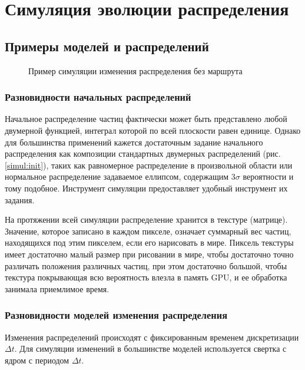 
\chapter{Симуляция эволюции распределения}
\section{Примеры моделей и распределений}
\begin{figure}[ht]
  \begin{center}
  \end{center}
  \caption{Пример симуляции изменения распределения без маршрута}
\end{figure}

\FloatBarrier
\subsection{Разновидности начальных распределений}
Начальное распределение частиц фактически может быть представлено любой двумерной функцией,
интеграл которой по всей плоскости равен единице. Однако для большинства применений кажется
достаточным задание начального распределения как композиции стандартных двумерных распределений
(рис. \ref{simul:init}), таких как равномерное распределение в произвольной области или
 нормальное распределение задаваемое еллипсом, содержащим $3\sigma$ вероятности и тому подобное.
 Инструмент симуляции предоставляет удобный инструмент их задания.

На протяжении всей симуляции распределение хранится в текстуре (матрице). Значение, которое
записано в каждом пикселе, означает суммарный вес частиц, находящихся под этим пикселем,
если его нарисовать в мире. Пиксель текстуры имеет достаточно малый размер при рисовании в мире,
чтобы достаточно точно различать положения различных частиц, при этом достаточно большой,
чтобы текстура покрывающая всю вероятность влезла в память GPU, и ее обработка занимала
приемлимое время. \FloatBarrier
\subsection{Разновидности моделей изменения распределения}
Изменения распределений происходят с фиксированным временем дискретизации $\Delta t$.
Для симуляции изменений в большинстве моделей используется свертка с ядром с периодом $\Delta t$.

